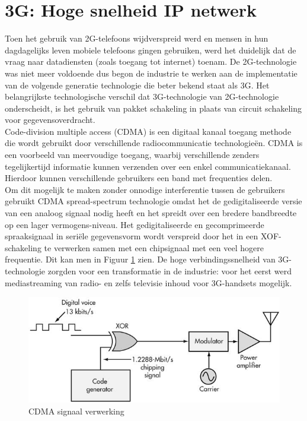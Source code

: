 \documentclass{article}
\begin{document}
\section{3G: Hoge snelheid IP netwerk}
Toen het gebruik van 2G-telefoons wijdverspreid werd en mensen in hun dagdagelijks leven mobiele telefoons gingen gebruiken, werd het duidelijk dat de vraag naar datadiensten (zoals toegang tot internet) toenam. De 2G-technologie was niet meer voldoende dus begon de industrie te werken aan de implementatie van de volgende generatie technologie die beter bekend staat als 3G. Het belangrijkste technologische verschil dat 3G-technologie van 2G-technologie onderscheidt, is het gebruik van pakket schakeling in plaats van circuit schakeling voor gegevensoverdracht. \cite{3g} \\

\noindent Code-division multiple access (CDMA) is een digitaal kanaal toegang methode die wordt gebruikt door verschillende radiocommunicatie technologieën. CDMA is een voorbeeld van meervoudige toegang, waarbij verschillende zenders tegelijkertijd informatie kunnen verzenden over een enkel communicatiekanaal. Hierdoor kunnen verschillende gebruikers een band met frequenties delen.\\

\noindent Om dit mogelijk te maken zonder onnodige interferentie tussen de gebruikers gebruikt CDMA spread-spectrum technologie omdat het de gedigitaliseerde versie van een analoog signaal nodig heeft en het spreidt over een bredere bandbreedte op een lager vermogens-niveau. Het gedigitaliseerde en gecomprimeerde spraaksignaal in seriële gegevensvorm wordt verspreid door het in een XOF-schakeling te verwerken samen met een chipsignaal met een veel hogere frequentie. Dit kan men in Figuur \ref{fig:cdma} zien. De hoge verbindingssnelheid van 3G-technologie zorgden voor een transformatie in de industrie: voor het eerst werd mediastreaming van radio- en zelfs televisie inhoud voor 3G-handsets mogelijk. \cite{FDMA} \\

\begin{figure}[H]
\centering
\includegraphics[width=0.75 \textwidth]{img/cdma.jpg}
\caption{CDMA signaal verwerking}
\label{fig:cdma}
\end{figure}
\end{document}
